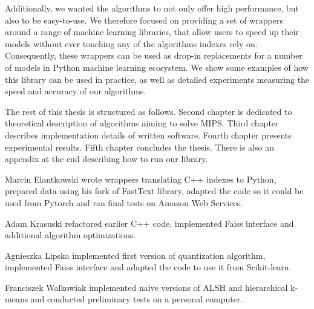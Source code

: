 Additionally, we wanted the algorithms to not only offer high performance, but also to be easy-to-use. We therefore
focused on providing a set of wrappers around a range of machine learning libraries, that allow users to 
speed up their models without ever touching any of the algorithms indexes rely on. Consequently,
these wrappers can be used as drop-in replacements for a number of models in Python machine learning ecosystem.
We show some examples of how this library can be used in practice,
as well as detailed experiments measuring the speed and accuracy of our algorithms.

The rest of this thesis is structured as follows.
Second chapter is dedicated to theoretical description of algorithms aiming to solve MIPS.
Third chapter describes implementation details of written software.
Fourth chapter presents experimental results.
Fifth chapter concludes the thesis.
There is also an appendix at the end describing how to run our library.

Marcin Elantkowski wrote wrappers translating C++ indexes to Python, prepared data using his fork of FastText
library, adapted the code so it could be used from Pytorch and ran final tests on Amazon Web Services.

Adam Krasuski refactored earlier C++ code, implemented Faiss interface and additional algorithm optimizations.

Agnieszka Lipska implemented first version of quantization algorithm, implemented Faiss interface and
adapted the code to use it from Scikit-learn.

Franciszek Walkowiak implemented naive versions of ALSH and hierarchical \mbox{k-means} and conducted 
preliminary tests on a personal computer.
